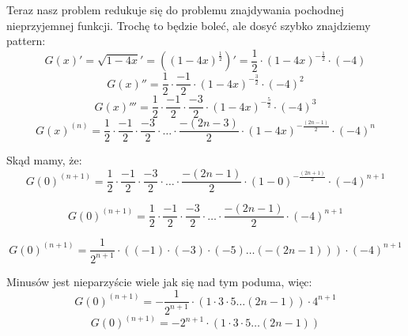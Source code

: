         Teraz nasz problem redukuje się do problemu znajdywania pochodnej nieprzyjemnej funkcji. Trochę to będzie boleć, ale dosyć szybko znajdziemy pattern:
        \begin{equation*}
            G(x)' = \sqrt{1 - 4x}' = ((1-4x)^{\frac{1}{2}})' = \frac{1}{2} \cdot (1-4x)^{- \frac{1}{2}} \cdot (-4)
        \end{equation*}
        \begin{equation*}
            G(x)'' = \frac{1}{2} \cdot \frac{-1}{2} \cdot (1-4x)^{- \frac{3}{2}} \cdot (-4)^2
        \end{equation*}
         \begin{equation*}
            G(x)''' = \frac{1}{2} \cdot \frac{-1}{2} \cdot \frac{-3}{2} \cdot (1-4x)^{- \frac{5}{2}} \cdot (-4)^3
        \end{equation*}
        \begin{equation*}
            G(x)^{(n)} = \frac{1}{2} \cdot \frac{-1}{2} \cdot \frac{-3}{2} \cdot \dots \cdot \frac{-(2n - 3)}{2} \cdot (1-4x)^{- \frac{(2n-1)}{2}} \cdot (-4)^n
        \end{equation*}

        Skąd mamy, że:
        \begin{equation*}
            G(0)^{(n+1)} = \frac{1}{2} \cdot \frac{-1}{2} \cdot \frac{-3}{2} \cdot \dots \cdot \frac{-(2n - 1)}{2} \cdot (1-0)^{- \frac{(2n+1)}{2}} \cdot (-4)^{n+1}
        \end{equation*}

         \begin{equation*}
            G(0)^{(n+1)} = \frac{1}{2} \cdot \frac{-1}{2} \cdot \frac{-3}{2} \cdot \dots \cdot \frac{-(2n - 1)}{2} \cdot (-4)^{n+1}
        \end{equation*}

      \begin{equation*}
            G(0)^{(n+1)} = \frac{1}{2^{n+1}} \cdot ( (-1) \cdot (-3) \cdot (-5) \dots (-(2n - 1))) \cdot (-4)^{n+1}
        \end{equation*}

        Minusów jest nieparzyście wiele jak się nad tym poduma, więc:
         \begin{equation*}
            G(0)^{(n+1)} = -\frac{1}{2^{n+1}} \cdot ( 1 \cdot 3 \cdot 5 \dots (2n - 1)) \cdot 4^{n+1}
        \end{equation*}
          \begin{equation*}
            G(0)^{(n+1)} = - 2^{n+1}  \cdot ( 1 \cdot 3 \cdot 5 \dots (2n - 1)) 
        \end{equation*}


